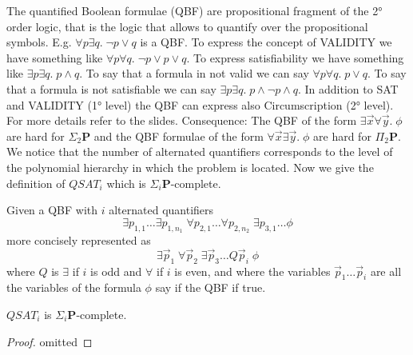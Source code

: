 The quantified Boolean formulae (QBF) are propositional fragment of the 2° order logic, that is the logic that allows to quantify over the propositional symbols. E.g. $\forall p \exists q.\; \neg p\lor q$ is a QBF. To express the concept of VALIDITY we have something like $\forall p\forall q.\;\neg p\lor p\lor q$. To express satisfiability we have something like $\exists p\exists q.\; p\land q$. To say that a formula in not valid we can say $\forall p\forall q.\; p\lor q$. To say that a formula is not satisfiable we can say $\exists p\exists q.\; p\land \neg p\land q$. In addition to SAT and VALIDITY (1° level) the QBF can express also Circumscription (2° level). For more details refer to the slides. Consequence: The QBF of the form $\exists \vec{x}\forall \vec{y}.\; \phi$ are hard for $\Sigma_2\mathbf{P}$ and the QBF formulae of the form $\forall \vec{x}\exists \vec{y}.\; \phi$ are hard for $\Pi_2\mathbf{P}$. We notice that the number of alternated quantifiers corresponds to the level of the polynomial hierarchy in which the problem is located. Now we give the definition of $QSAT_i$ which is $\Sigma_i\mathbf{P}$-complete.\\
\begin{defbox}[$QSAT_i$]
    Given a QBF with $i$ alternated quantifiers
    \[
\exists p_{1,1} \dots \exists p_{1,n_1} \; \forall p_{2,1} \dots \forall p_{2,n_2} \; \exists p_{3,1} \dots \phi
\]
 more concisely represented as
 \[
\exists \vec{p}_1 \; \forall \vec{p}_2 \; \exists \vec{p}_3 \dots Q \vec{p}_i \; \phi
\]
where $Q$ is $\exists$ if $i$ is odd and $\forall$ if $i$ is even, and where the variables $\vec{p}_1\dots\vec{p}_i$ are all the variables of the formula $\phi$ say if the QBF if true.
\end{defbox}
\begin{defbox}[Theorem]
    $QSAT_i$ is $\Sigma_i\mathbf{P}$-complete.
\end{defbox}
\begin{proof}
omitted
\end{proof}
